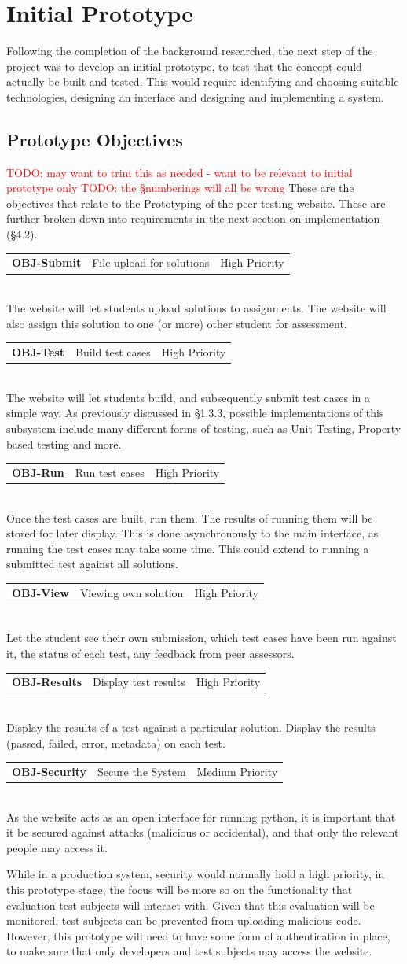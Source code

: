 \documentclass[a4paper,11pt]{report}
\newcommand{\objitem}[4]{\begin{tabularx}{\textwidth}{lXr} \textbf{OBJ-#1} & #2 & #3\end{tabularx}\\#4\\}
\newcommand{\todo}[1]{\textcolor{red}{TODO: #1}}
\begin{document}
\chapter{Initial Prototype}
Following the completion of the background researched, the next step of the project was to develop an initial prototype, to test that the concept could actually be built and tested. This would require identifying and choosing suitable technologies, designing an interface and designing and implementing a system.

\section{Prototype Objectives}
\todo{may want to trim this as needed - want to be relevant to initial prototype only}
\todo{the \S numberings will all be wrong}
These are the objectives that relate to the Prototyping of the peer testing website. These are further broken down into requirements in the next section on implementation (\S4.2).
\objitem{Submit}{File upload for solutions}{High Priority}{The website will let students upload solutions to assignments. The website will also assign this solution to one (or more) other student for assessment.}
\objitem{Test}{Build test cases}{High Priority}{The website will let students build, and subsequently submit test cases in a simple way. As previously discussed in \S1.3.3, possible implementations of this subsystem include many different forms of testing, such as Unit Testing, Property based testing and more.}
\objitem{Run}{Run test cases}{High Priority}{Once the test cases are built, run them. The results of running them will be stored for later display. This is done asynchronously to the main interface, as running the test cases may take some time. This could extend to running a submitted test against all solutions.}
\objitem{View}{Viewing own solution}{High Priority}{Let the student see their own submission, which test cases have been run against it, the status of each test, any feedback from peer assessors.}
\objitem{Results}{Display test results}{High Priority}{Display the results of a test against a particular solution. Display the results (passed, failed, error, metadata) on each test.}
\objitem{Security}{Secure the System}{Medium Priority}{As the website acts as an open interface for running python, it is important that it be secured against attacks (malicious or accidental), and that only the relevant people may access it.\par
While in a production system, security would normally hold a high priority, in this prototype stage, the focus will be more so on the functionality that evaluation test subjects will interact with. Given that this evaluation will be monitored, test subjects can be prevented from uploading malicious code. However, this prototype will need to have some form of authentication in place, to make sure that only developers and test subjects may access the website.}
\end{document}
